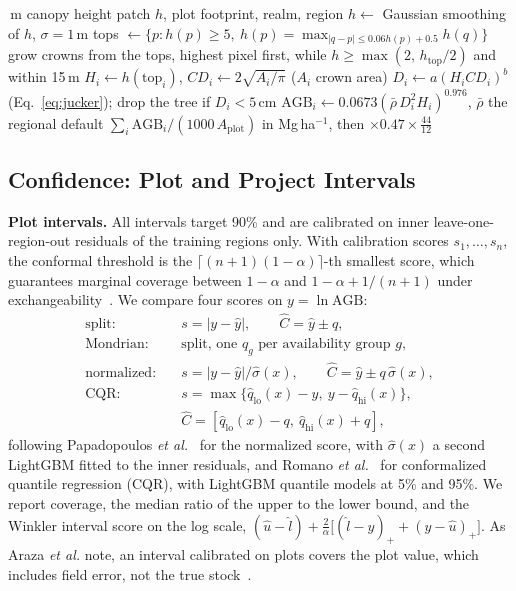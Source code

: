 \documentclass[conference,a4paper]{IEEEtran}
\begin{document}
\begin{algorithm}[t]
\caption{E4: Count the Trees, Then the Field Formula}
\label{alg:e4}
\footnotesize
\begin{algorithmic}[1]
\,m canopy height patch $h$, plot footprint, realm, region
\State $h\gets$ Gaussian smoothing of $h$, $\sigma=1$\,m
\State tops $\gets\{p: h(p)\ge5,\ h(p)=\max_{|q-p|\le0.06h(p)+0.5}h(q)\}$
\State grow crowns from the tops, highest pixel first, while $h\ge\max(2,\,h_{\mathrm{top}}/2)$ and within 15\,m
\State $H_i\gets h(\mathrm{top}_i)$, $CD_i\gets2\sqrt{A_i/\pi}$ ($A_i$ crown area)
\State $D_i\gets a(H_iCD_i)^b$ (Eq.~\ref{eq:jucker}); drop the tree if $D_i<5$\,cm
\State $\mathrm{AGB}_i\gets0.0673(\bar\rho\,D_i^2H_i)^{0.976}$, $\bar\rho$ the regional default
\EndFor
\State \Return $\sum_i\mathrm{AGB}_i/(1000\,A_{\mathrm{plot}})$ in Mg\,ha$^{-1}$, then $\times0.47\times\frac{44}{12}$
\end{algorithmic}
\end{algorithm}

\subsection{Confidence: Plot and Project Intervals}
\textbf{Plot intervals.} All intervals target 90\% and are calibrated on inner leave-one-region-out residuals of the training regions only. With calibration scores $s_1,\dots,s_n$, the conformal threshold is the $\lceil(n+1)(1-\alpha)\rceil$-th smallest score, which guarantees marginal coverage between $1-\alpha$ and $1-\alpha+1/(n+1)$ under exchangeability~\cite{lei2018distribution}. We compare four scores on $y=\ln\mathrm{AGB}$:
\begin{align}
\text{split:}\quad & s=|y-\hat y|, \qquad \hat C=\hat y\pm q,\\
\text{Mondrian:}\quad & \text{split, one } q_g \text{ per availability group } g,\\
\text{normalized:}\quad & s=|y-\hat y|/\hat\sigma(x), \qquad \hat C=\hat y\pm q\,\hat\sigma(x),\\
\text{CQR:}\quad & s=\max\{\hat q_{\mathrm{lo}}(x)-y,\ y-\hat q_{\mathrm{hi}}(x)\},\\
& \hat C=[\hat q_{\mathrm{lo}}(x)-q,\ \hat q_{\mathrm{hi}}(x)+q],
\end{align}
following Papadopoulos \textit{et al.}~\cite{papadopoulos2008normalized} for the normalized score, with $\hat\sigma(x)$ a second LightGBM fitted to the inner residuals, and Romano \textit{et al.}~\cite{romano2019cqr} for conformalized quantile regression (CQR), with LightGBM quantile models at 5\% and 95\%. We report coverage, the median ratio of the upper to the lower bound, and the Winkler interval score on the log scale, $(\hat u-\hat l)+\tfrac{2}{\alpha}\big[(\hat l-y)_+ + (y-\hat u)_+\big]$. As Araza \textit{et al.} note, an interval calibrated on plots covers the plot value, which includes field error, not the true stock~\cite{araza2022comprehensive}.
\end{document}
